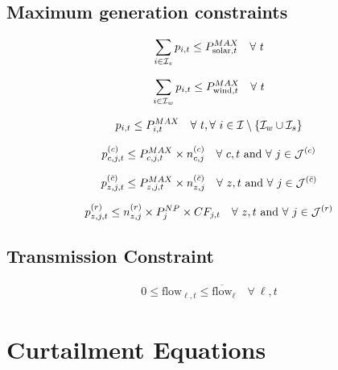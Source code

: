 \documentclass[11pt, oneside]{article}   	%
\newcommand{\flow}{\text{flow}}
\newcommand{\bc}{\bar{c}}
\begin{document}
\subsection{Maximum generation constraints}

\begin{equation} \label{eq:ex_solar}
\begin{split}
\sum_{i \in \mathcal{I}_s} p_{i, t} \le P^{MAX}_{\text{solar}, t} \quad \forall~t
\end{split}
\end{equation}

\begin{equation} \label{eq:ex_wind}
\begin{split}
\sum_{i \in \mathcal{I}_w} p_{i, t} \le P^{MAX}_{\text{wind}, t} \quad \forall~t
\end{split}
\end{equation}

\begin{equation} \label{eq:ex_therm}
\begin{split}
p_{i, t} \le P^{MAX}_{i, t} \quad \forall~t, \forall~i \in \mathcal{I} \setminus \{\mathcal{I}_w \cup \mathcal{I}_s \}
\end{split}
\end{equation}

\begin{equation} \label{eq:new_therm}
\begin{split}
p^{(c)}_{c, j, t} \le P^{MAX}_{c, j, t} \times n^{(c)}_{c, j} \quad \forall~c, t  \text{ and }\forall~j\in \mathcal{J}^{(c)}
\end{split}
\end{equation}

\begin{equation} \label{eq:new_therm2}
\begin{split}
p^{(\bc)}_{z, j, t} \le P^{MAX}_{z, j, t} \times n^{(\bc)}_{z, j} \quad \forall~z, t  \text{ and }\forall~j\in \Jc^{(\bc)}
\end{split}
\end{equation}

\begin{equation} \label{eq:new_ren}
\begin{split}
p^{(r)}_{z, j, t} \le n^{(r)}_{z, j}\times P^{NP}_{j} \times CF_{j, t}  \quad \forall~z, t  \text{ and }\forall~j\in \mathcal{J}^{(r)}
\end{split}
\end{equation}

\subsection{Transmission Constraint}

\begin{equation} \label{eq:trans}
\begin{split}
0 \le \flow_{\ell, t} \le   \overline{\flow}_{\ell} \quad \forall~\ell, t
\end{split}
\end{equation}


\newpage
\section{Curtailment Equations}
\end{document}
